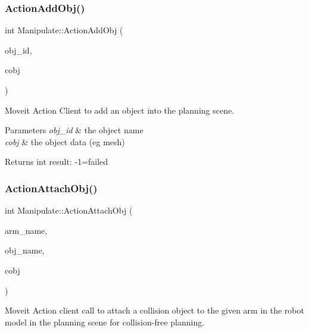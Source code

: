 \subsubsection{\texorpdfstring{Action\+Add\+Obj()}{ActionAddObj()}}
{\footnotesize\ttfamily int Manipulate\+::\+Action\+Add\+Obj (\begin{DoxyParamCaption}\item[{string}]{obj\+\_\+id,  }\item[{moveit\+\_\+msgs\+::\+Collision\+Object}]{cobj }\end{DoxyParamCaption})\hspace{0.3cm}{\ttfamily [private]}}



Moveit Action Client to add an object into the planning scene. 


\begin{DoxyParams}{Parameters}
{\em obj\+\_\+id} & the object name \\
\hline
{\em cobj} & the object data (eg mesh) \\
\hline
\end{DoxyParams}
\begin{DoxyReturn}{Returns}
int result\+: -\/1=failed 
\end{DoxyReturn}
\mbox{\label{structManipulate_a078e4f4dd5e337e937fb502d8b8d4fc9}} 
\subsubsection{\texorpdfstring{Action\+Attach\+Obj()}{ActionAttachObj()}}
{\footnotesize\ttfamily int Manipulate\+::\+Action\+Attach\+Obj (\begin{DoxyParamCaption}\item[{string}]{arm\+\_\+name,  }\item[{string}]{obj\+\_\+name,  }\item[{moveit\+\_\+msgs\+::\+Collision\+Object}]{cobj }\end{DoxyParamCaption})\hspace{0.3cm}{\ttfamily [private]}}



Moveit Action client call to attach a collision object to the given arm in the robot model in the planning scene for collision-\/free planning. 



